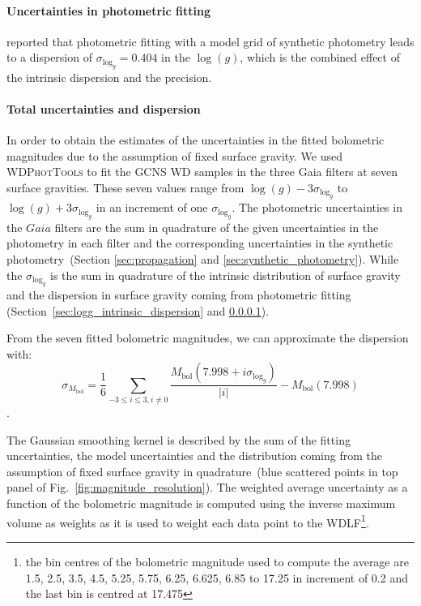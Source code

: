 \documentclass[fleqn,usenatbib]{mnras}
\begin{document}
\paragraph{Uncertainties in photometric fitting \hfill\\}
\label{sec:logg_photometric_fitting}
\citet{2014ApJ...796..128G} reported that photometric fitting with a model
grid of synthetic photometry leads to a dispersion of
$\sigma_{\mathrm{log}_{g}} = 0.404$ in the $\log(g)$, which is the combined
effect of the intrinsic dispersion and the precision.

\paragraph*{Total uncertainties and dispersion \hfill\\}
In order to obtain the estimates of the uncertainties in the fitted bolometric
magnitudes due to the assumption of fixed surface gravity. We used
\textsc{WDPhotTools} to fit the GCNS WD samples in the three Gaia filters at
seven surface gravities. These seven values range from
$\log(g) - 3\sigma_{\mathrm{log}_{g}}$ to $\log(g) + 3\sigma_{\mathrm{log}_{g}}$
in an increment of one $\sigma_{\mathrm{log}_{g}}$. The photometric
uncertainties in the $Gaia$ filters are the sum in quadrature of the given
uncertainties in the photometry in each filter and the corresponding
uncertainties in the synthetic photometry~(Section \ref{sec:propagation} and
\ref{sec:synthetic_photometry}). While the $\sigma_{\mathrm{log}_{g}}$ is the
sum in quadrature of the intrinsic distribution of surface gravity and the
dispersion in surface gravity coming from photometric fitting~
(Section~\ref{sec:logg_intrinsic_dispersion} and \ref{sec:logg_photometric_fitting}).

From the seven fitted
bolometric magnitudes, we can approximate the dispersion with:
\begin{equation}
  \sigma_{M_{\mathrm{bol}}} = \frac{1}{6}\sum_{-3 \leq i \leq 3, i \neq 0}\frac{M_{\mathrm{bol}}(7.998 + i\sigma_{\mathrm{log}_{g}})}{|i|} - M_{\mathrm{bol}}(7.998)
\end{equation}
.

The Gaussian smoothing kernel is described by the sum of the fitting
uncertainties, the model uncertainties and the distribution coming from the
assumption of fixed surface gravity in quadrature~(blue scattered points in top
panel of Fig.~\ref{fig:magnitude_resolution}). The weighted average uncertainty
as a function of the bolometric magnitude is computed using the inverse maximum
volume as weights as it is used to weight each data point to the WDLF\footnote{
the bin centres of the bolometric magnitude used to compute the average are
1.5,  2.5,  3.5,  4.5,  5.25,  5.75,  6.25,  6.625, 6.85 to 17.25 in increment
of 0.2 and the last bin is centred at 17.475}.
\end{document}
